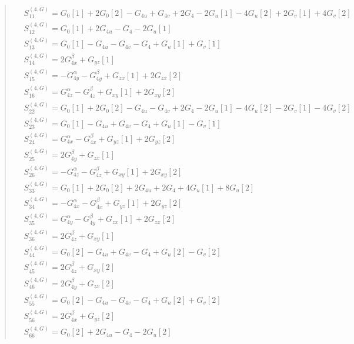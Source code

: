 \documentclass[fleqn,10pt]{jsarticle}
\begin{document}
\begin{quote}
\begin{align*}
& S^{(4,G)}_{11} = G_{0}[1] + 2 G_{0}[2] - G_{4u} + G_{4v} + 2 G_{4} - 2 G_{u}[1] - 4 G_{u}[2] + 2 G_{v}[1] + 4 G_{v}[2] \\
& S^{(4,G)}_{12} = G_{0}[1] + 2 G_{4u} - G_{4} - 2 G_{u}[1] \\
& S^{(4,G)}_{13} = G_{0}[1] - G_{4u} - G_{4v} - G_{4} + G_{u}[1] + G_{v}[1] \\
& S^{(4,G)}_{14} = 2 G_{4x}^{\beta} + G_{yz}[1] \\
& S^{(4,G)}_{15} = - G_{4y}^{\alpha} - G_{4y}^{\beta} + G_{zx}[1] + 2 G_{zx}[2] \\
& S^{(4,G)}_{16} = G_{4z}^{\alpha} - G_{4z}^{\beta} + G_{xy}[1] + 2 G_{xy}[2] \\
& S^{(4,G)}_{22} = G_{0}[1] + 2 G_{0}[2] - G_{4u} - G_{4v} + 2 G_{4} - 2 G_{u}[1] - 4 G_{u}[2] - 2 G_{v}[1] - 4 G_{v}[2] \\
& S^{(4,G)}_{23} = G_{0}[1] - G_{4u} + G_{4v} - G_{4} + G_{u}[1] - G_{v}[1] \\
& S^{(4,G)}_{24} = G_{4x}^{\alpha} - G_{4x}^{\beta} + G_{yz}[1] + 2 G_{yz}[2] \\
& S^{(4,G)}_{25} = 2 G_{4y}^{\beta} + G_{zx}[1] \\
& S^{(4,G)}_{26} = - G_{4z}^{\alpha} - G_{4z}^{\beta} + G_{xy}[1] + 2 G_{xy}[2] \\
& S^{(4,G)}_{33} = G_{0}[1] + 2 G_{0}[2] + 2 G_{4u} + 2 G_{4} + 4 G_{u}[1] + 8 G_{u}[2] \\
& S^{(4,G)}_{34} = - G_{4x}^{\alpha} - G_{4x}^{\beta} + G_{yz}[1] + 2 G_{yz}[2] \\
& S^{(4,G)}_{35} = G_{4y}^{\alpha} - G_{4y}^{\beta} + G_{zx}[1] + 2 G_{zx}[2] \\
& S^{(4,G)}_{36} = 2 G_{4z}^{\beta} + G_{xy}[1] \\
& S^{(4,G)}_{44} = G_{0}[2] - G_{4u} + G_{4v} - G_{4} + G_{u}[2] - G_{v}[2] \\
& S^{(4,G)}_{45} = 2 G_{4z}^{\beta} + G_{xy}[2] \\
& S^{(4,G)}_{46} = 2 G_{4y}^{\beta} + G_{zx}[2] \\
& S^{(4,G)}_{55} = G_{0}[2] - G_{4u} - G_{4v} - G_{4} + G_{u}[2] + G_{v}[2] \\
& S^{(4,G)}_{56} = 2 G_{4x}^{\beta} + G_{yz}[2] \\
& S^{(4,G)}_{66} = G_{0}[2] + 2 G_{4u} - G_{4} - 2 G_{u}[2]
\end{align*}
\end{quote}
\end{document}
